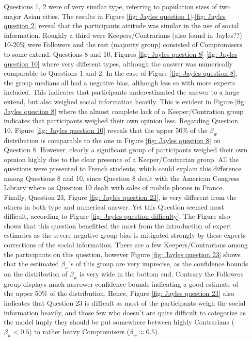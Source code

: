 \documentclass[9pt,twoside,lineno]{pnas-new}
\begin{document}
Questions 1, 2 were of very similar type, referring to population sizes of two major Asian cities. The results in Figure \ref{fig: Jayles question 1}-\ref{fig: Jayles question 2} reveal that the participants attitude was similar in the use of social information. Roughly a third were Keepers/Contrarians (also found in Jayles??) 10-20\% were Followers and the rest (majority group) consisted of Compromisers to some extend. Questions 8 and 10, Figures \ref{fig: Jayles question 8}-\ref{fig: Jayles question 10} where very different types, although the answer was numerically comparable to Questions 1 and 2. In the case of Figure \ref{fig: Jayles question 8}, the group medians all had a negative bias, although less so with more experts included. This indicates that participants underestimated the answer to a large extend, but also weighed social information heavily. This is evident in Figure \ref{fig: Jayles question 8} where the almost complete lack of a Keeper/Contration group indicates that participants weighed their own opinion less. Regarding Question 10, Figure \ref{fig: Jayles question 10} reveals that the upper 50\% of the $\beta_w$ distribution is comparable to the one in Figure \ref{fig: Jayles question 8} on Question 8. However, clearly a significant group of participants weighed their own opinion highly due to the clear presence of a Keeper/Contrarian group. All the questions were presented to French students, which could explain this difference among Questions 8 and 10, since Question 8 dealt with the American Congress Library where as Question 10 dealt with sales of mobile phones in France. Finally, Question 23, Figure \ref{fig: Jayles question 23}, is very different from the others in both type and numerical answer. Yet this Question seemed most difficult, according to Figure \ref{fig: Jayles question difficulty}. The Figure also shows that this question benefitted the most from the introduction of expert estimates as the severe negative group bias is mitigated strongly by these experts corrections of the social information. There are a few Keepers/Contrarians among the participants on this question, however Figure \ref{fig: Jayles question 23} shows that the estimated $\beta_w$'s of this group are very imprecise, as the confidence bounds on the distribution of $\beta_w$ is very wide in the bottom end. Contrary the Followers group displays much narrower confidence bounds indicating a good estimate of the upper 50\% of the distribution. Hence, Figure \ref{fig: Jayles question 23} also indicates that Question 23 is difficult as most of the participants weigh the social information heavily, and those few who doesn't are quite difficult to categorize as the model imply they should be put somewhere between highly Contrarians ($\beta_w<0.5$) to rather heavy Compromisers ($\beta_w\approx 0.5$).
\end{document}
